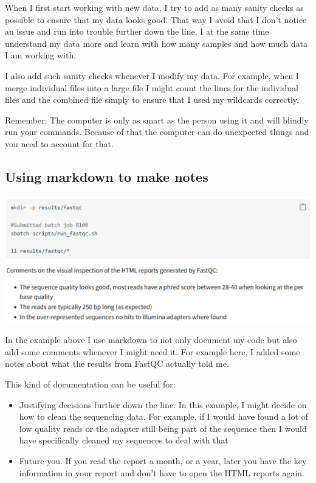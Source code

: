 \documentclass[
  letterpaper,
  DIV=11,
  numbers=noendperiod]{scrreprt}
\begin{document}
When I first start working with new data, I try to add as many sanity
checks as possible to ensure that my data looks good. That way I avoid
that I don't notice an issue and run into trouble further down the line.
I at the same time understand my data more and learn with how many
samples and how much data I am working with.

I also add such sanity checks whenever I modify my data. For example,
when I merge individual files into a large file I might count the lines
for the individual files and the combined file simply to ensure that I
used my wildcards correctly.

Remember: The computer is only as smart as the person using it and will
blindly run your commands. Because of that the computer can do
unexpected things and you need to account for that.

\subsection{Using markdown to make
notes}\label{using-markdown-to-make-notes}

\includegraphics[width=5.65625in,height=\textheight]{../img/comments_in_code.png}

In the example above I use markdown to not only document my code but
also add some comments whenever I might need it. For example here, I
added some notes about what the results from FastQC actually told me.

This kind of documentation can be useful for:

\begin{itemize}
\item
  Justifying decisions further down the line. In this example, I might
  decide on how to clean the sequencing data. For example, if I would
  have found a lot of low quality reads or the adapter still being part
  of the sequence then I would have specifically cleaned my sequences to
  deal with that
\item
  Future you. If you read the report a month, or a year, later you have
  the key information in your report and don't have to open the HTML
  reports again.
\end{itemize}
\end{document}
